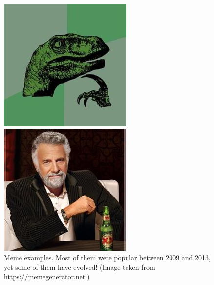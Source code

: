 \documentclass[paper=letter, fontsize=11pt]{scrartcl}
\begin{document}
\begin{figure}[h]
\begin{minipage}[r]{0.2\linewidth}
    \end{minipage}\hfill
    \begin{minipage}[r]{0.2\linewidth}
    \includegraphics[width=\linewidth]{img/meme4.jpg}
    \end{minipage}\hfill
    \begin{minipage}[r]{0.2\linewidth}
    \includegraphics[width=\linewidth]{img/meme6.jpg}
    \end{minipage}
	\caption{
        Meme examples. Most of them were 
        popular between 2009 and 2013, yet some of them have evolved!
        (Image taken from \url{https://memegenerator.net}.)
    }
    \label{fig1}
\end{figure}
\end{document}
